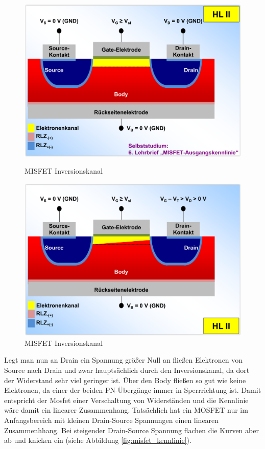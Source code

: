 \documentclass[12pt,a4paper]{report}%
\numberwithin{equation}{section}
\numberwithin{equation}{subsection}
\begin{document}
  \begin{figure}[H] 
			\centering
			\begin{minipage}{.5\textwidth}
			  \centering
			  \captionsetup{justification=centering}
	      \includegraphics[width=0.9\linewidth]{misfet_inversion_full.png}
	      \caption{MISFET Inversionskanal \protect\cite{MIKRO2}}
	      \label{fig:misfet_inversion_full}
			\end{minipage}%
			\begin{minipage}{.5\textwidth}
			  \centering
			  \captionsetup{justification=centering}
			  \includegraphics[width=0.9\linewidth]{misfet_inversion_less.png}
			  \caption{MISFET Inversionskanal  \protect\cite{MIKRO2}}
			  \label{fig:misfet_inversion_less}
			\end{minipage}%
	  \end{figure}
	  Legt man nun an Drain ein Spannung größer Null an fließen Elektronen von Source nach Drain und zwar hauptsächlich durch den Inversionskanal, da dort der Widerstand sehr viel geringer ist. Über den Body fließen so gut wie keine Elektronen, da einer der beiden PN-Übergänge immer in Sperrrichtung ist. Damit entspricht der Mosfet einer Verschaltung von Widerständen und die Kennlinie wäre damit ein linearer Zusammenhang. Tatsächlich hat ein MOSFET nur im Anfangsbereich mit kleinen Drain-Source Spannungen einen linearen Zusammenhhang. Bei steigender Drain-Source Spannung flachen die Kurven aber ab und knicken ein (siehe Abbildung \ref{fig:misfet_kennlinie}).
\end{document}
